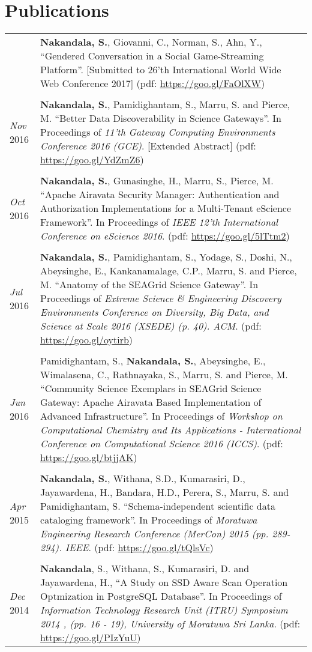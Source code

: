 \documentclass[a4paper,10pt]{article}
\begin{document}
\section{Publications}

\begin{tabular}{p{3cm}p{13.5cm}}

& \textbf{Nakandala, S.}, Giovanni, C., Norman, S., Ahn, Y., ``Gendered Conversation in a Social Game-Streaming Platform''. [Submitted to 26'th International World Wide Web Conference 2017] (pdf: \url{https://goo.gl/FaOlXW})
\\\\
\emph{Nov} 2016 & \textbf{Nakandala, S.}, Pamidighantam, S., Marru, S. and Pierce, M. ``Better Data Discoverability in Science Gateways''. In Proceedings of \textit{11'th Gateway Computing Environments Conference 2016 (GCE)}. [Extended Abstract] (pdf: \url{https://goo.gl/YdZmZ6})
\\\\
\emph{Oct} 2016 & \textbf{Nakandala, S.}, Gunasinghe, H., Marru, S., Pierce, M. ``Apache Airavata Security Manager: Authentication and Authorization Implementations for a Multi-Tenant eScience Framework''. In Proceedings of \textit{IEEE 12'th International Conference on eScience 2016}. (pdf: \url{https://goo.gl/5lTtm2})
\\\\
\emph{Jul} 2016 & \textbf{Nakandala, S.}, Pamidighantam, S., Yodage, S., Doshi, N., Abeysinghe, E., Kankanamalage, C.P., Marru, S. and Pierce, M. ``Anatomy of the SEAGrid Science Gateway''. In Proceedings of \textit{Extreme Science \& Engineering Discovery Environments Conference on Diversity, Big Data, and Science at Scale 2016 (XSEDE) (p. 40). ACM}. (pdf: \url{https://goo.gl/oytirb})
\\\\
\emph{Jun} 2016 & Pamidighantam, S., \textbf{Nakandala, S.}, Abeysinghe, E., Wimalasena, C., Rathnayaka, S., Marru, S. and Pierce, M. ``Community Science Exemplars in SEAGrid Science Gateway: Apache Airavata Based Implementation of Advanced Infrastructure''. In Proceedings of \textit{Workshop on Computational Chemistry and Its Applications - International Conference on Computational Science 2016 (ICCS)}. (pdf: \url{https://goo.gl/btjjAK})
\\\\
\emph{Apr} 2015 & \textbf{Nakandala, S.}, Withana, S.D., Kumarasiri, D., Jayawardena, H., Bandara, H.D., Perera, S., Marru, S. and Pamidighantam, S. ``Schema-independent scientific data cataloging framework''. In Proceedings of \textit{Moratuwa Engineering Research Conference (MerCon) 2015 (pp. 289-294). IEEE}. (pdf: \url{https://goo.gl/tQlsVc})
\\\\
\emph{Dec} 2014 & \textbf{Nakandala}, S., Withana, S., Kumarasiri, D. and Jayawardena, H., ``A Study on SSD Aware Scan Operation Optmization in PostgreSQL Database''. In Proceedings of \textit{Information Technology Research Unit (ITRU) Symposium 2014 , (pp. 16 - 19), University of Moratuwa Sri Lanka}. (pdf: \url{https://goo.gl/PIzYuU})
\end{tabular}
\end{document}
